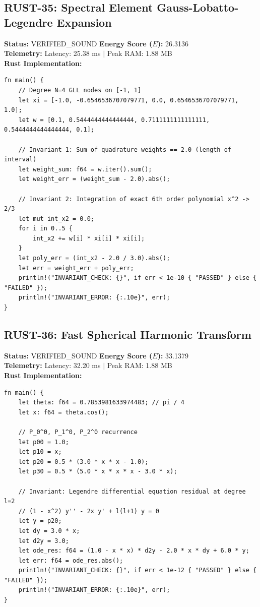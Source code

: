 \documentclass[11pt, a4paper]{article}
\begin{document}
\subsection{RUST-35: Spectral Element Gauss-Lobatto-Legendre Expansion}
\textbf{Status:} VERIFIED\_SOUND \hfill \textbf{Energy Score ($E$):} 26.3136\\
\textbf{Telemetry:} Latency: 25.38 ms $|$ Peak RAM: 1.88 MB\\
\textbf{Rust Implementation:}
\begin{verbatim}
fn main() {
    // Degree N=4 GLL nodes on [-1, 1]
    let xi = [-1.0, -0.6546536707079771, 0.0, 0.6546536707079771, 1.0];
    let w = [0.1, 0.5444444444444444, 0.7111111111111111, 0.5444444444444444, 0.1];
    
    // Invariant 1: Sum of quadrature weights == 2.0 (length of interval)
    let weight_sum: f64 = w.iter().sum();
    let weight_err = (weight_sum - 2.0).abs();
    
    // Invariant 2: Integration of exact 6th order polynomial x^2 -> 2/3
    let mut int_x2 = 0.0;
    for i in 0..5 {
        int_x2 += w[i] * xi[i] * xi[i];
    }
    let poly_err = (int_x2 - 2.0 / 3.0).abs();
    let err = weight_err + poly_err;
    println!("INVARIANT_CHECK: {}", if err < 1e-10 { "PASSED" } else { "FAILED" });
    println!("INVARIANT_ERROR: {:.10e}", err);
}
\end{verbatim}

\subsection{RUST-36: Fast Spherical Harmonic Transform}
\textbf{Status:} VERIFIED\_SOUND \hfill \textbf{Energy Score ($E$):} 33.1379\\
\textbf{Telemetry:} Latency: 32.20 ms $|$ Peak RAM: 1.88 MB\\
\textbf{Rust Implementation:}
\begin{verbatim}
fn main() {
    let theta: f64 = 0.7853981633974483; // pi / 4
    let x: f64 = theta.cos();
    
    // P_0^0, P_1^0, P_2^0 recurrence
    let p00 = 1.0;
    let p10 = x;
    let p20 = 0.5 * (3.0 * x * x - 1.0);
    let p30 = 0.5 * (5.0 * x * x * x - 3.0 * x);
    
    // Invariant: Legendre differential equation residual at degree l=2
    // (1 - x^2) y'' - 2x y' + l(l+1) y = 0
    let y = p20;
    let dy = 3.0 * x;
    let d2y = 3.0;
    let ode_res: f64 = (1.0 - x * x) * d2y - 2.0 * x * dy + 6.0 * y;
    let err: f64 = ode_res.abs();
    println!("INVARIANT_CHECK: {}", if err < 1e-12 { "PASSED" } else { "FAILED" });
    println!("INVARIANT_ERROR: {:.10e}", err);
}
\end{verbatim}
\end{document}
